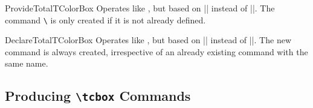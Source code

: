 \begin{docCommand}{ProvideTotalTColorBox}{}
  Operates like , but based on |\ProvideDocumentCommand| instead of |\NewDocumentCommand|.
  The command \texttt{\textbackslash} is only created if it is not already defined.
\end{docCommand}

\begin{docCommand}{DeclareTotalTColorBox}{}
  Operates like , but based on |\DeclareDocumentCommand| instead of |\NewDocumentCommand|.
  The new command is always created, irrespective of an already existing
  command with the same name.
\end{docCommand}


\clearpage
\subsection{Producing \texttt{\textbackslash tcbox} Commands}\label{subsec:macros_tcbox}

